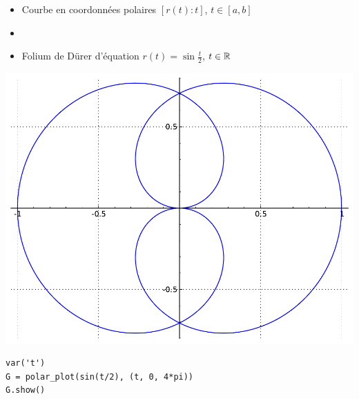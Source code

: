 \begin{frame}[fragile]

\begin{itemize}
  \item Courbe en coordonnées polaires $[r(t):t]$, $t \in [a,b]$
  \pause
  \item {}
  \pause
  \item Folium de Dürer d'équation 
$r(t) = \sin \frac t 2$, $t \in \mathbb{R}$
\end{itemize}

\begin{center}
 \includegraphics[scale=0.30]{figures/durer_folium} 
\end{center}

  \pause
\begin{algo}
\begin{lstlisting}
var('t')
G = polar_plot(sin(t/2), (t, 0, 4*pi))
G.show()
\end{lstlisting}
\end{algo}

\end{frame}


